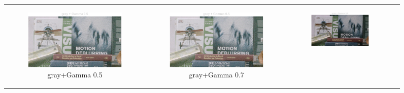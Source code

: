 \documentclass[11pt, a4]{article}
\begin{document}
\begin{enumerate}
\begin{enumerate}
\begin{figure}[h]
{\begin{tabular}{cccc}
						\begin{subfigure}[h]{0.45\linewidth}
							\centering
							\includegraphics[width=\linewidth]{../output/RawImage1_Tone_gray_Gamma0.5.pdf}
							\caption{gray+Gamma 0.5}
							\label{fig:RawImage1_tone_2}
						\end{subfigure} &
						\begin{subfigure}[h]{0.45\linewidth}
							\centering
							\includegraphics[width=\linewidth]{../output/RawImage1_Tone_gray_Gamma0.5.pdf}
							\caption{gray+Gamma 0.7}
							\label{fig:RawImage1_tone_3}
						\end{subfigure} &
						\begin{subfigure}[h]{0.45\linewidth}
							\centering
							\includegraphics[width=\linewidth]{../output/RawImage1_Tone_gray_Gamma0.9.pdf}

\end{subfigure}
\end{tabular}}
\end{figure}
\end{enumerate}
\end{enumerate}
\end{document}
